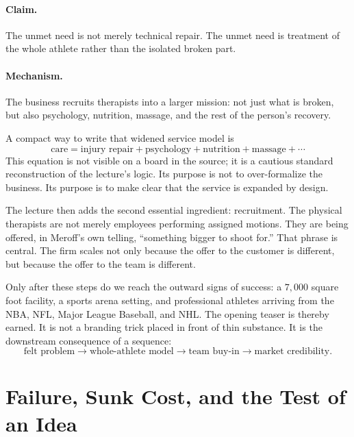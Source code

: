 \paragraph{Claim.}
The unmet need is not merely technical repair. The unmet need is treatment of the whole athlete rather than the isolated broken part.

\paragraph{Mechanism.}
The business recruits therapists into a larger mission: not just what is broken, but also psychology, nutrition, massage, and the rest of the person's recovery.

A compact way to write that widened service model is
\begin{equation}
\text{care}
=
\text{injury repair}
+
\text{psychology}
+
\text{nutrition}
+
\text{massage}
+\cdots
\end{equation}
This equation is not visible on a board in the source; it is a cautious standard reconstruction of the lecture's logic. Its purpose is not to over-formalize the business. Its purpose is to make clear that the service is expanded by design.

The lecture then adds the second essential ingredient: recruitment. The physical therapists are not merely employees performing assigned motions. They are being offered, in Meroff's own telling, ``something bigger to shoot for.'' That phrase is central. The firm scales not only because the offer to the customer is different, but because the offer to the team is different.

Only after these steps do we reach the outward signs of success: a $7{,}000$ square foot facility, a sports arena setting, and professional athletes arriving from the NBA, NFL, Major League Baseball, and NHL. The opening teaser is thereby earned. It is not a branding trick placed in front of thin substance. It is the downstream consequence of a sequence:
\begin{equation}
\text{felt problem}
\longrightarrow
\text{whole-athlete model}
\longrightarrow
\text{team buy-in}
\longrightarrow
\text{market credibility}.
\end{equation}

\section{Failure, Sunk Cost, and the Test of an Idea}

